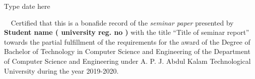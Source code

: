 \begin{flushright}
{Type date here}\\ \bigskip                                  
\end{flushright}

\jadafont
  {~~Certified that this  is a bonafide record of the {\em seminar paper} presented by {\bf Student name (  
  {university reg. no} )} with the title ``{{\sc \large Title of seminar report}}'' towards the partial fulfillment of the 
  requirements for the award of the Degree of Bachelor of Technology in Computer Science and Engineering of the 
  Department of Computer Science and Engineering under A. P. J. Abdul Kalam Technological University
  during the year 2019-2020.
  }
  
\vspace*{3cm}
\hspace*{-.5in}
\parbox{2.0in}{
 \\
}
 \parbox{2.0in}{
  \\
 }
\parbox{2.0in}{
\noindent  \\ 
 \\
\\
}
\vspace*{1cm}
\parskip 8pt
\clearpage  
  
